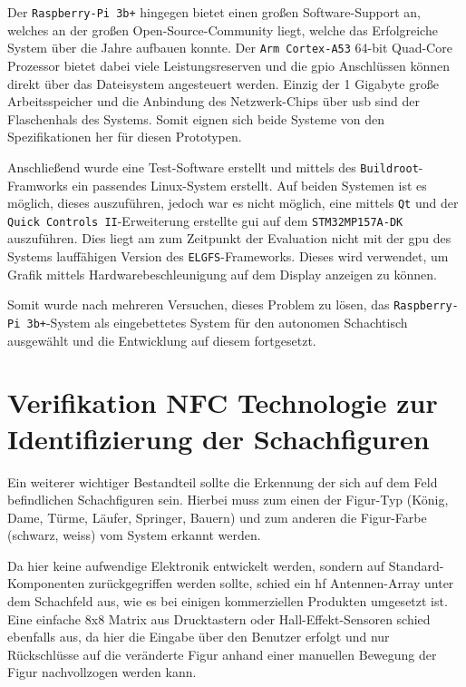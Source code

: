 Der \passthrough{\lstinline!Raspberry-Pi 3b+!} hingegen bietet einen
großen Software-Support an, welches an der großen Open-Source-Community
liegt, welche das Erfolgreiche System über die Jahre aufbauen konnte.
Der \passthrough{\lstinline!Arm Cortex-A53!} 64-bit Quad-Core Prozessor
bietet dabei viele Leistungsreserven und die \gls{gpio} Anschlüssen
können direkt über das Dateisystem angesteuert werden. Einzig der 1
Gigabyte große Arbeitsspeicher und die Anbindung des Netzwerk-Chips über
\gls{usb} sind der Flaschenhals des Systems. Somit eignen sich beide
Systeme von den Spezifikationen her für diesen Prototypen.

Anschließend wurde eine Test-Software erstellt und mittels des
\passthrough{\lstinline!Buildroot!}-Framworks ein passendes Linux-System
erstellt. Auf beiden Systemen ist es möglich, dieses auszuführen, jedoch
war es nicht möglich, eine mittels \passthrough{\lstinline!Qt!} und der
\passthrough{\lstinline!Quick Controls II!}-Erweiterung erstellte
\gls{gui} auf dem \passthrough{\lstinline!STM32MP157A-DK!} auszuführen.
Dies liegt am zum Zeitpunkt der Evaluation nicht mit der \gls{gpu} des
Systems lauffähigen Version des
\passthrough{\lstinline!ELGFS!}-Frameworks. Dieses wird verwendet, um
Grafik mittels Hardwarebeschleunigung auf dem Display anzeigen zu
können.

Somit wurde nach mehreren Versuchen, dieses Problem zu lösen, das
\passthrough{\lstinline!Raspberry-Pi 3b+!}-System als eingebettetes
System für den autonomen Schachtisch ausgewählt und die Entwicklung auf
diesem fortgesetzt.

\hypertarget{verifikation-nfc-technologie-zur-identifizierung-der-schachfiguren}{%
\section{Verifikation NFC Technologie zur Identifizierung der
Schachfiguren}\label{verifikation-nfc-technologie-zur-identifizierung-der-schachfiguren}}

Ein weiterer wichtiger Bestandteil sollte die Erkennung der sich auf dem
Feld befindlichen Schachfiguren sein. Hierbei muss zum einen der
Figur-Typ (König, Dame, Türme, Läufer, Springer, Bauern) und zum anderen
die Figur-Farbe (schwarz, weiss) vom System erkannt werden.

Da hier keine aufwendige Elektronik entwickelt werden, sondern auf
Standard-Komponenten zurückgegriffen werden sollte, schied ein \gls{hf}
Antennen-Array unter dem Schachfeld aus, wie es bei einigen
kommerziellen Produkten umgesetzt ist. Eine einfache 8x8 Matrix aus
Drucktastern oder Hall-Effekt-Sensoren schied ebenfalls aus, da hier die
Eingabe über den Benutzer erfolgt und nur Rückschlüsse auf die
veränderte Figur anhand einer manuellen Bewegung der Figur nachvollzogen
werden kann.


